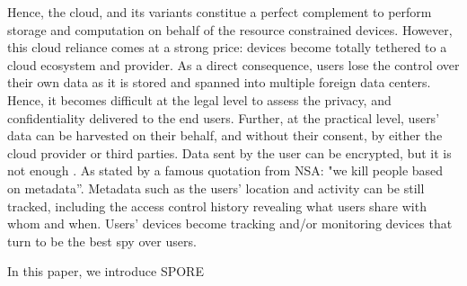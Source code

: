Hence, the cloud, and its variants constitue a perfect complement
to perform storage and computation on behalf of the resource
constrained devices. However, this cloud reliance comes at a strong price:
devices become totally tethered to a cloud ecosystem and provider. As
a direct consequence, users lose the control over their own data as it is
stored and spanned into multiple foreign data centers. Hence, it becomes difficult at 
the legal level to assess the privacy, and
confidentiality delivered to the end users. Further, at the practical
level, users' data can be harvested on their behalf, and without their
consent, by either the cloud provider or third parties.
Data sent by the user can be encrypted, but it is not enough
\cite{granick_2017, HooffLZZ15}. As stated by a famous quotation from
NSA: "we kill people based on metadata''. Metadata such as the users'
location and activity can be still tracked, including the access
control history revealing what users share with whom and when.
Users’ devices become tracking and/or monitoring devices that turn to
be the best spy over users. 

In this paper, we introduce SPORE
